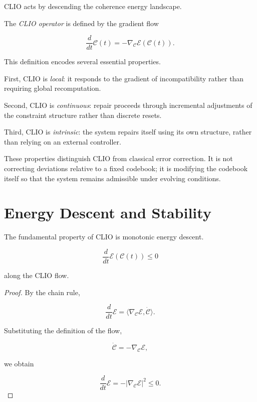 \documentclass[11pt,openany]{book}
\begin{document}
CLIO acts by descending the coherence energy landscape.

\begin{definition}
\label{def:clio-operator}
The \emph{CLIO operator} is defined by the gradient flow

$$
\frac{d}{dt} \mathcal{C}(t)
= - \nabla_{\mathcal{C}} \mathcal{E}(\mathcal{C}(t)).
$$

\end{definition}

This definition encodes several essential properties.

First, CLIO is \emph{local}: it responds to the gradient of
incompatibility rather than requiring global recomputation.

Second, CLIO is \emph{continuous}: repair proceeds through
incremental adjustments of the constraint structure rather
than discrete resets.

Third, CLIO is \emph{intrinsic}: the system repairs itself
using its own structure, rather than relying on an external
controller.

These properties distinguish CLIO from classical error
correction.  It is not correcting deviations relative to a
fixed codebook; it is modifying the codebook itself so that
the system remains admissible under evolving conditions.

\section{Energy Descent and Stability}
\label{sec:descent}

The fundamental property of CLIO is monotonic energy descent.

\begin{proposition}
\label{prop:descent}

$$
\frac{d}{dt} \mathcal{E}(\mathcal{C}(t)) \le 0
$$

along the CLIO flow.
\end{proposition}

\begin{proof}
By the chain rule,

$$
\frac{d}{dt} \mathcal{E}
= \langle \nabla_{\mathcal{C}} \mathcal{E},
\dot{\mathcal{C}} \rangle.
$$

Substituting the definition of the flow,

$$
\dot{\mathcal{C}} = -\nabla_{\mathcal{C}} \mathcal{E},
$$

we obtain

$$
\frac{d}{dt} \mathcal{E}
= - |\nabla_{\mathcal{C}} \mathcal{E}|^2 \le 0.
$$

\end{proof}
\end{document}
